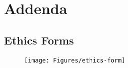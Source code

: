 \chapter{Addenda}

\section{Ethics Forms}
\begin{figure}[ht!]
	\texttt{[image: Figures/ethics-form]}
\end{figure}